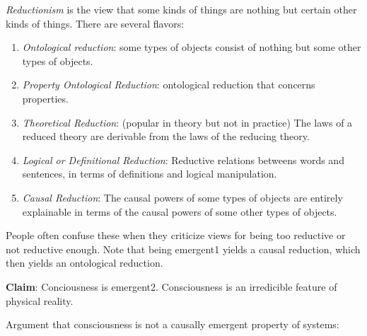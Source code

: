 \documentclass{article}
\newcommand{\ti}[1]{\textit{#1}}
\newcommand{\tb}[1]{\textbf{#1}}
\begin{document}
\ti{Reductionism} is the view that some kinds of things are nothing but certain other kinds of things. There are several flavors:
\begin{enumerate}
    \item \ti{Ontological reduction}: some types of objects consist of nothing but some other types of objects.
    \item \ti{Property Ontological Reduction}: ontological reduction that concerns properties.
    \item \ti{Theoretical Reduction}: (popular in theory but not in practice) The laws of a reduced theory are derivable from the laws of the reducing theory.
    \item \ti{Logical or Definitional Reduction}: Reductive relations betweens words and sentences, in terms of definitions and logical manipulation.
    \item \ti{Causal Reduction}: The causal powers of some types of objects are entirely explainable in terms of the causal powers of some other types of objects.
\end{enumerate}

People often confuse these when they criticize views for being too reductive or not reductive enough. Note that being emergent1 yields a causal reduction, which then yields an ontological reduction.

\tb{Claim}: Conciousness is emergent2. Consciousness is an irredicible feature of physical reality.

Argument that consciousness is not a causally emergent property of systems:
\end{document}
